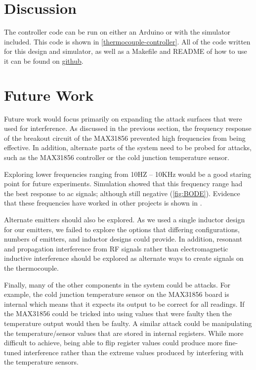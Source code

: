 \section{Discussion}\label{disc}
The controller code can be run on either an Arduino or with the simulator included. This code is shown in \cref{thermocouple-controller}. All of the code written for this design and simulator, as well as a Makefile and README of how to use it can be found on \href{https://github.com/RSAkidinUSA/tc-volt-check}{github}.

\section{Future Work}\label{fut}
Future work would focus primarily on expanding the attack surfaces that were used for interference. As discussed in the previous section, the frequency response of the breakout circuit of the MAX31856 prevented high frequencies from being effective. In addition, alternate parts of the system need to be probed for attacks, such as the MAX31856 controller or the cold junction temperature sensor.

Exploring lower frequencies ranging from 10HZ – 10KHz would be a good staring point for future experiments. Simulation showed that this frequency range had the best response to \ac{ac} signals; although still negative (\cref{fig:BODE}). Evidence that these frequencies have worked in other projects is shown in \cite{Chakraborty82,Smalcerz2013}.

Alternate emitters should also be explored. As we used a single inductor design for our emitters, we failed to explore the options that differing configurations, numbers of emitters, and inductor designs could provide. In addition, resonant and propagation interference from RF signals rather than electromagnetic inductive interference should be explored as alternate ways to create signals on the thermocouple.

Finally, many of the other components in the system could be attacks. For example, the cold junction temperature sensor on the MAX31856 board is internal which means that it expects its output to be correct for all readings. If the MAX31856 could be tricked into using values that were faulty then the temperature output would then be faulty. A similar attack could be manipulating the temperature/sensor values that are stored in internal registers. While more difficult to achieve, being able to flip register values could produce more fine-tuned interference rather than the extreme values produced by interfering with the temperature sensors.
